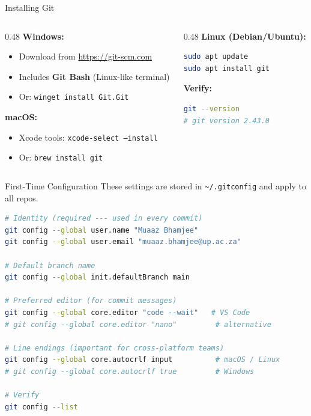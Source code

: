 \documentclass[aspectratio=169, 11pt]{beamer}
\begin{document}
\begin{frame}[fragile]{Installing Git}
  \begin{columns}[T]
    \begin{column}{0.48\textwidth}
      \textbf{Windows:}
      \begin{itemize}
        \item Download from \url{https://git-scm.com}
        \item Includes \textbf{Git Bash} (Linux-like terminal)
        \item Or: \texttt{winget install Git.Git}
      \end{itemize}

      \vspace{0.5em}
      \textbf{macOS:}
      \begin{itemize}
        \item Xcode tools: \texttt{xcode-select --install}
        \item Or: \texttt{brew install git}
      \end{itemize}
    \end{column}
    \begin{column}{0.48\textwidth}
      \textbf{Linux (Debian/Ubuntu):}
      \begin{lstlisting}[language=bash]
sudo apt update
sudo apt install git
      \end{lstlisting}

      \vspace{0.5em}
      \textbf{Verify:}
      \begin{lstlisting}[language=bash]
git --version
# git version 2.43.0
      \end{lstlisting}
    \end{column}
  \end{columns}
\end{frame}

\begin{frame}[fragile]{First-Time Configuration}
  These settings are stored in \texttt{\textasciitilde/.gitconfig} and apply to all repos.

  \begin{lstlisting}[language=bash]
# Identity (required --- used in every commit)
git config --global user.name "Muaaz Bhamjee"
git config --global user.email "muaaz.bhamjee@up.ac.za"

# Default branch name
git config --global init.defaultBranch main

# Preferred editor (for commit messages)
git config --global core.editor "code --wait"   # VS Code
# git config --global core.editor "nano"         # alternative

# Line endings (important for cross-platform teams)
git config --global core.autocrlf input          # macOS / Linux
# git config --global core.autocrlf true         # Windows

# Verify
git config --list
  \end{lstlisting}
\end{frame}
\end{document}

